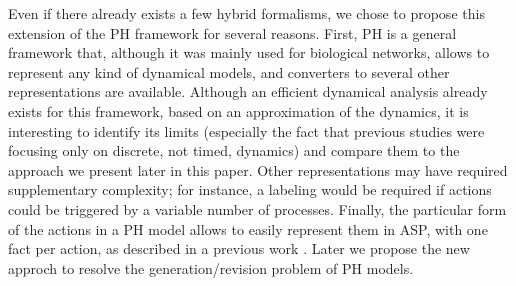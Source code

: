 Even if there already exists a few hybrid formalisms, we chose to propose this extension of the PH framework for several reasons.
First, PH is a general framework that,
although it was mainly used for biological networks,
allows to represent any kind of dynamical models,
and converters to several other representations are available.
Although an efficient dynamical analysis already exists for this framework,
based on an approximation of the dynamics,
it is interesting to identify its limits (especially the fact that previous studies were focusing only on discrete, not timed, dynamics)
and compare them to the approach we present later in this paper. Other representations may have required supplementary complexity;
for instance, a labeling would be required
if actions could be triggered by a variable number of processes.
Finally, the particular form of the actions in a  PH model allows
to easily represent them in ASP,
with one fact per action, as described in a previous work \cite{benabdallah2015}. Later we propose the new approch to resolve the generation/revision problem of PH models.



